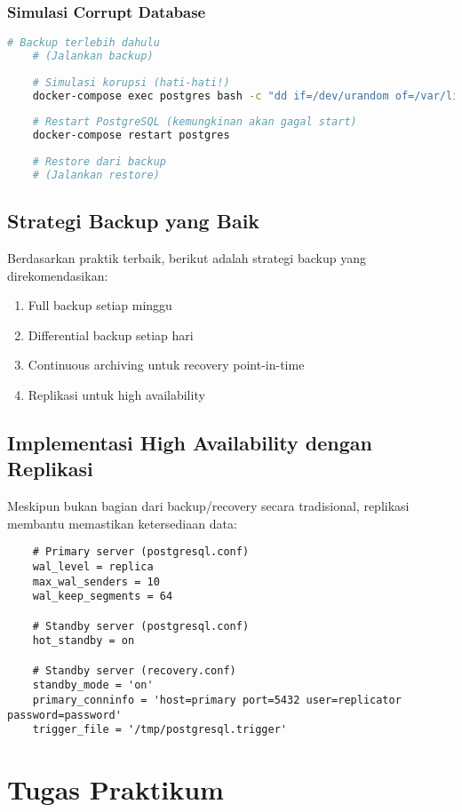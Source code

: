 \subsubsection{Simulasi Corrupt Database}
\begin{lstlisting}[language=bash]
	# Backup terlebih dahulu
	# (Jalankan backup)
	
	# Simulasi korupsi (hati-hati!)
	docker-compose exec postgres bash -c "dd if=/dev/urandom of=/var/lib/postgresql/data/base/16384/1234 bs=8192 count=1 conv=notrunc"
	
	# Restart PostgreSQL (kemungkinan akan gagal start)
	docker-compose restart postgres
	
	# Restore dari backup
	# (Jalankan restore)
\end{lstlisting}

\subsection{Strategi Backup yang Baik}
Berdasarkan praktik terbaik, berikut adalah strategi backup yang direkomendasikan:
\begin{enumerate}
	\item Full backup setiap minggu
	\item Differential backup setiap hari
	\item Continuous archiving untuk recovery point-in-time
	\item Replikasi untuk high availability
\end{enumerate}

\subsection{Implementasi High Availability dengan Replikasi}
Meskipun bukan bagian dari backup/recovery secara tradisional, replikasi membantu memastikan ketersediaan data:

\begin{lstlisting}
	# Primary server (postgresql.conf)
	wal_level = replica
	max_wal_senders = 10
	wal_keep_segments = 64
	
	# Standby server (postgresql.conf)
	hot_standby = on
	
	# Standby server (recovery.conf)
	standby_mode = 'on'
	primary_conninfo = 'host=primary port=5432 user=replicator password=password'
	trigger_file = '/tmp/postgresql.trigger'
\end{lstlisting}

\section{Tugas Praktikum}


